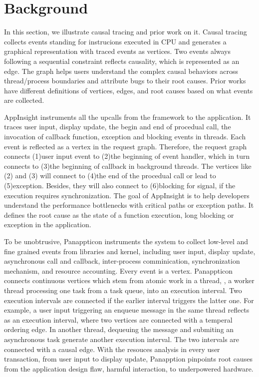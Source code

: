 \section{Background} \label{sec:background}

In this section, we illustrate causal tracing and prior work on it. Causal
tracing collects events standing for instrucions executed in CPU and generates
a graphical representation with traced events as vertices. Two events always
following a sequential constraint reflects causality, which is represented
as an edge. The graph helps users understand the complex causal behaviors across
thread/process boundaries and attribute bugs to their root causes. Prior works
have different definitions of vertices, edges, and root causes based on what
events are collected.

AppInsight instruments all the upcalls from the framework to the application.
It traces user input, display update, the begin and end of procedual call, the
invocation of callback function, exception and blocking events in threads. Each
event is reflected as a vertex in the request graph. Therefore, the request
graph connects (1)user input event to (2)the beginning of event handler, which
in turn connects to (3)the beginning of callback in background threads. The
vertices like (2) and (3) will connect to (4)the end of the procedual call
or lead to (5)exception. Besides, they will also connect to (6)blocking for
signal, if the execution requires synchronization. The goal of AppInsight is to
help developers understand the performance bottlenecks with critical paths or
exception paths. It defines the root cause as the state of a function execution,
long blocking or exception in the application.

To be unobtrusive, Panappticon instruments the system to collect low-level
and fine grained events from libraries and kernel, including user input,
display update, asynchronous call and callback, inter-process comminication,
synchronization mechanism, and resource accounting. Every event is a vertex.
Panappticon connects continuous vertices which stem from atomic work in a
thread, \eg, a worker thread processing one task from a task queue, into
an execution interval. Two execution intervals are connected if the earlier
interval triggers the latter one. For example, a user input triggering an
enqueue message in the same thread reflects as an execution interval, where
two vertices are connected with a temperal ordering edge. In another thread,
dequeuing the message and submiting an asynchronous task generate another
execution interval. The two intervals are connected with a causal edge. With the
resouces analysis in every user transaction, from user input to display update,
Panapption pinpoints root causes from the application design flaw, harmful
interaction, to underpowered hardware.
